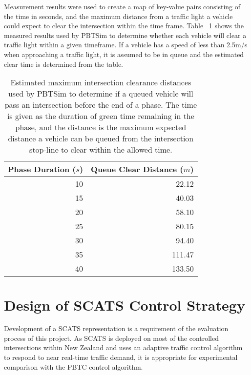 Measurement results were used to create a map of key-value pairs consisting of the time in seconds, and the maximum distance from a traffic light a vehicle could expect to clear the intersection within the time frame. Table ~\ref{vehiclecleardistances} shows the measured results used by PBTSim to determine whether each vehicle will clear a traffic light within a given timeframe. If a vehicle has a speed of less than 2.5m/s when approaching a traffic light, it is assumed to be in queue and the estimated clear time is determined from the table.

\begin{table}[]
\begin{center}
\begin{tabular}{rr}
\toprule
Phase Duration ($s$) & Queue Clear Distance ($m$) \\
\midrule
10 & 22.12 \\
15 & 40.03 \\
20 & 58.10 \\
25 & 80.15 \\
30 & 94.40 \\
35 & 111.47 \\
40 & 133.50 \\
\bottomrule
\end{tabular}
\end{center}
\caption{ Estimated maximum intersection clearance distances used by PBTSim to determine if a queued vehicle will pass an intersection before the end of a phase. The time is given as the duration of green time remaining in the phase, and the distance is the maximum expected distance a vehicle can be queued from the intersection stop-line to clear within the allowed time. }
\label{vehiclecleardistances}
\end{table}

\section{Design of SCATS Control Strategy}
\label{sec:scats_strategy}

Development of a SCATS representation is a requirement of the evaluation process of this project. As SCATS is deployed on most of the controlled intersections within New Zealand and uses an adaptive traffic control algorithm to respond to near real-time traffic demand, it is appropriate for experimental comparison with the PBTC control algorithm.

